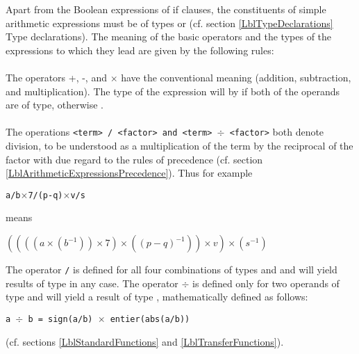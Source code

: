 \documentclass[a4paper,11pt]{article}
\begin{document}
Apart from the Boolean expressions of if clauses, the constituents of
simple arithmetic expressions must be of types  or
 (cf. section \ref{LblTypeDeclarations} Type
declarations).  The meaning of the basic operators and the types of
the expressions to which they lead are given by the following rules:

\paragraph{} \label{LblOperatorsAndTypesP1}
The operators +, -, and $\times$ have the conventional meaning
(addition, subtraction, and multiplication).  The type of the
expression will by  if both of the operands are of
 type, otherwise .

\paragraph{} \label{LblOperatorsAndTypesP2}
The operations \texttt{<term> / <factor> and <term> $\div$ <factor>}
both denote division, to be understood as a multiplication of the term
by the reciprocal of the factor with due regard to the rules of
precedence (cf. section \ref{LblArithmeticExpressionsPrecedence}).
Thus for example

\begin{flushleft}
\texttt{a/b$\times$7/(p-q)$\times$v/s}\\
\end{flushleft}

means

\begin{flushleft}
\texttt{$((((a\times(b^{-1}))\times7)\times((p-q)^{-1}))\times{}v)\times(s^{-1})$}\\
\end{flushleft}

The operator \texttt{/} is defined for all four combinations of types
 and  and will yield results of 
type in any case.  The operator $\div$ is defined only for two
operands of type  and will yield a result of type
, mathematically defined as follows:

\begin{flushleft}
\texttt{a $\div$ b = sign(a/b) $\times$ entier(abs(a/b))}\\
\end{flushleft}

(cf. sections \ref{LblStandardFunctions} and \ref{LblTransferFunctions}).
\end{document}
